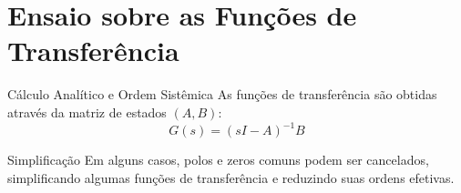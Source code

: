 \section{Ensaio sobre as Funções de Transferência}

\begin{frame}{Cálculo Analítico e Ordem Sistêmica}
  As funções de transferência são obtidas através da matriz de estados $(A, B)$:
  \begin{equation}
    G(s) = (sI - A)^{-1}B
  \end{equation}


  \vspace{0.3cm}

  \begin{block}{Simplificação}
    Em alguns casos, polos e zeros comuns podem ser cancelados,
    simplificando algumas funções de transferência e reduzindo
    suas ordens efetivas.
  \end{block}
\end{frame}

